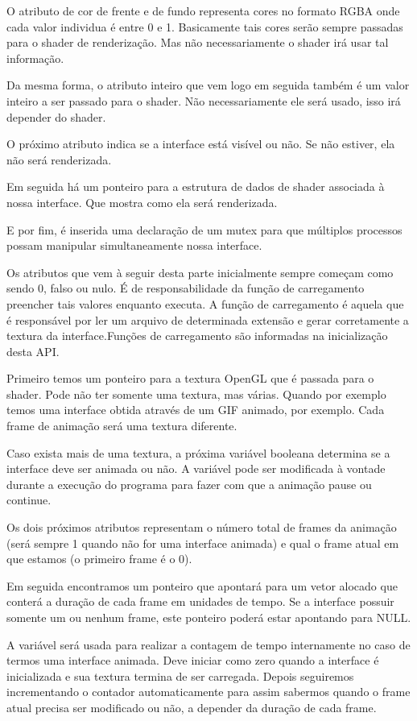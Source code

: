 O atributo de cor de frente e de fundo representa cores no formato
RGBA onde cada valor individua é entre 0 e 1. Basicamente tais cores
serão sempre passadas para o shader de renderização. Mas não
necessariamente o shader irá usar tal informação.

Da mesma forma, o atributo inteiro que vem logo em seguida também é um
valor inteiro a ser passado para o shader. Não necessariamente ele
será usado, isso irá depender do shader.

O próximo atributo indica se a interface está visível ou não. Se não
estiver, ela não será renderizada.

Em seguida há um ponteiro para a estrutura de dados de shader
associada à nossa interface. Que mostra como ela será renderizada.

E por fim, é inserida uma declaração de um mutex para que múltiplos
processos possam manipular simultaneamente nossa interface.

Os atributos que vem à seguir desta parte inicialmente sempre começam
como sendo 0, falso ou nulo. É de responsabilidade da função de
carregamento preencher tais valores enquanto executa. A função de
carregamento é aquela que é responsável por ler um arquivo de
determinada extensão e gerar corretamente a textura da
interface.Funções de carregamento são informadas na inicialização
desta API.

Primeiro temos um ponteiro para a textura OpenGL que é passada para o
shader. Pode não ter somente uma textura, mas várias. Quando por
exemplo temos uma interface obtida através de um GIF animado, por
exemplo. Cada frame de animação será uma textura diferente.

Caso exista mais de uma textura, a próxima variável booleana determina
se a interface deve ser animada ou não. A variável pode ser modificada
à vontade durante a execução do programa para fazer com que a animação
pause ou continue.

Os dois próximos atributos representam o número total de frames da
animação (será sempre 1 quando não for uma interface animada) e qual o
frame atual em que estamos (o primeiro frame é o 0).

Em seguida encontramos um ponteiro que apontará para um vetor alocado
que conterá a duração de cada frame em unidades de tempo. Se a
interface possuir somente um ou nenhum frame, este ponteiro poderá
estar apontando para NULL.

A variável  será usada para realizar a contagem de
tempo internamente no caso de termos uma interface animada. Deve
iniciar como zero quando a interface é inicializada e sua textura
termina de ser carregada. Depois seguiremos incrementando o contador
automaticamente para assim sabermos quando o frame atual precisa ser
modificado ou não, a depender da duração de cada frame.

